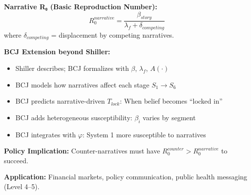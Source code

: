 \begin{tcolorbox}[colback=green!5!white, colframe=green!75!black,
    title=Theorem BCJ-T24: Shiller Narrative Economics as Special Case]
\textbf{Narrative R₀ (Basic Reproduction Number):}
\begin{equation}
R_0^{narrative} = \frac{\beta_{story}}{\lambda_f + \delta_{competing}}
\end{equation}
where $\delta_{competing}$ = displacement by competing narratives.

\textbf{BCJ Extension beyond Shiller:}
\begin{itemize}[nosep]
\item Shiller describes; BCJ formalizes with $\beta$, $\lambda_f$, $A(\cdot)$
\item BCJ models how narratives affect each stage $S_1 \to S_6$
\item BCJ predicts narrative-driven $T_{lock}$: When belief becomes ``locked in''
\item BCJ adds heterogeneous susceptibility: $\beta_i$ varies by segment
\item BCJ integrates with $\varphi$: System 1 more susceptible to narratives
\end{itemize}

\textbf{Policy Implication:} Counter-narratives must have $R_0^{counter} > R_0^{narrative}$ to succeed.

\textbf{Application:} Financial markets, policy communication, public health messaging (Level 4--5).
\end{tcolorbox}


